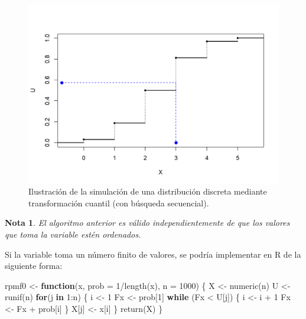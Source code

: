 \documentclass[
]{book}
\newenvironment{Shaded}{\begin{snugshade}}{\end{snugshade}}
\newcommand{\AttributeTok}[1]{\textcolor[rgb]{0.77,0.63,0.00}{#1}}
\newcommand{\ControlFlowTok}[1]{\textcolor[rgb]{0.13,0.29,0.53}{\textbf{#1}}}
\newcommand{\DecValTok}[1]{\textcolor[rgb]{0.00,0.00,0.81}{#1}}
\newcommand{\FunctionTok}[1]{\textcolor[rgb]{0.00,0.00,0.00}{#1}}
\newcommand{\NormalTok}[1]{#1}
\newcommand{\OtherTok}[1]{\textcolor[rgb]{0.56,0.35,0.01}{#1}}
\newcommand{\SpecialCharTok}[1]{\textcolor[rgb]{0.00,0.00,0.00}{#1}}
\theoremstyle{break}
\theoremstyle{nonumberplain}
\newtheorem{remark}{Nota}
\begin{document}
\begin{figure}[!htb]

{\centering \includegraphics[width=0.8\linewidth]{images/cuantil-sim} 

}

\caption{Ilustración de la simulación de una distribución discreta mediante transformación cuantil (con búsqueda secuencial).}\label{fig:cuantil-movie}
\end{figure}

\begin{remark}
El algoritmo anterior es válido independientemente de que los valores que toma la variable estén ordenados.
\end{remark}

Si la variable toma un número finito de valores, se podría implementar en R de la siguiente forma:

\begin{Shaded}
\begin{Highlighting}[]
\NormalTok{rpmf0 }\OtherTok{\textless{}{-}} \ControlFlowTok{function}\NormalTok{(x, }\AttributeTok{prob =} \DecValTok{1}\SpecialCharTok{/}\FunctionTok{length}\NormalTok{(x), }\AttributeTok{n =} \DecValTok{1000}\NormalTok{) \{}
\NormalTok{  X }\OtherTok{\textless{}{-}} \FunctionTok{numeric}\NormalTok{(n)}
\NormalTok{  U }\OtherTok{\textless{}{-}} \FunctionTok{runif}\NormalTok{(n)}
  \ControlFlowTok{for}\NormalTok{(j }\ControlFlowTok{in} \DecValTok{1}\SpecialCharTok{:}\NormalTok{n) \{}
\NormalTok{    i }\OtherTok{\textless{}{-}} \DecValTok{1}
\NormalTok{    Fx }\OtherTok{\textless{}{-}}\NormalTok{ prob[}\DecValTok{1}\NormalTok{]}
    \ControlFlowTok{while}\NormalTok{ (Fx }\SpecialCharTok{\textless{}}\NormalTok{ U[j]) \{}
\NormalTok{      i }\OtherTok{\textless{}{-}}\NormalTok{ i }\SpecialCharTok{+} \DecValTok{1}
\NormalTok{      Fx }\OtherTok{\textless{}{-}}\NormalTok{ Fx }\SpecialCharTok{+}\NormalTok{ prob[i]}
\NormalTok{    \}}
\NormalTok{    X[j] }\OtherTok{\textless{}{-}}\NormalTok{ x[i]}
\NormalTok{  \}}
  \FunctionTok{return}\NormalTok{(X)}
\NormalTok{\}}
\end{Highlighting}
\end{Shaded}
\end{document}
